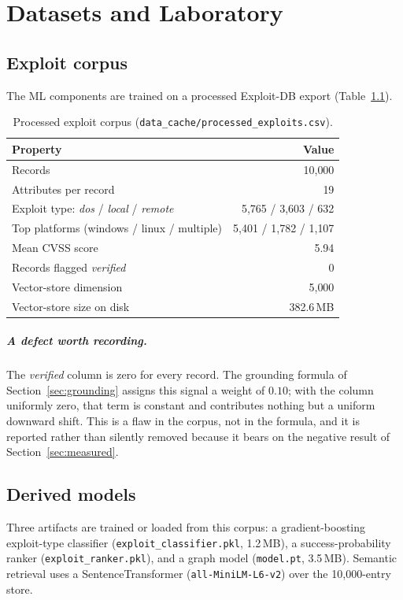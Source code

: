 \documentclass[11pt,a4paper]{report}
\newcommand{\code}[1]{\texttt{\small #1}}
\begin{document}
\chapter{Datasets and Laboratory}

\section{Exploit corpus}
The ML components are trained on a processed Exploit-DB export
(Table~\ref{tab:dataset}).

\begin{table}[h]
\centering
\caption{Processed exploit corpus (\code{data\_cache/processed\_exploits.csv}).}
\label{tab:dataset}
\begin{tabular}{lr}
\toprule
\textbf{Property} & \textbf{Value}\\
\midrule
Records & 10{,}000 \\
Attributes per record & 19 \\
Exploit type: \emph{dos} / \emph{local} / \emph{remote} & 5{,}765 / 3{,}603 / 632 \\
Top platforms (windows / linux / multiple) & 5{,}401 / 1{,}782 / 1{,}107 \\
Mean CVSS score & 5.94 \\
Records flagged \emph{verified} & \textcolor{accent}{0} \\
Vector-store dimension & 5{,}000 \\
Vector-store size on disk & 382.6\,MB \\
\bottomrule
\end{tabular}
\end{table}

\paragraph{A defect worth recording.} The \emph{verified} column is zero for
every record. The grounding formula of Section~\ref{sec:grounding} assigns this
signal a weight of $0.10$; with the column uniformly zero, that term is constant
and contributes nothing but a uniform downward shift. This is a flaw in the
corpus, not in the formula, and it is reported rather than silently removed
because it bears on the negative result of Section~\ref{sec:measured}.

\section{Derived models}
Three artifacts are trained or loaded from this corpus: a gradient-boosting
exploit-type classifier (\code{exploit\_classifier.pkl}, 1.2\,MB), a
success-probability ranker (\code{exploit\_ranker.pkl}), and a graph model
(\code{model.pt}, 3.5\,MB). Semantic retrieval uses a SentenceTransformer
(\code{all-MiniLM-L6-v2}) over the 10{,}000-entry store.
\end{document}
